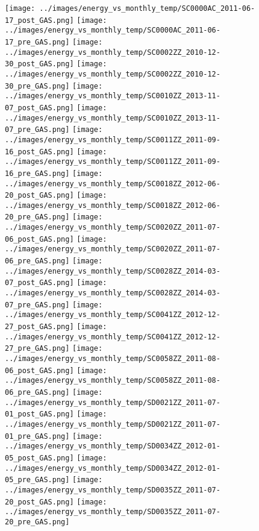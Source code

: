 \clearpage
\begin{figure}
\centering
\texttt{[image: ../images/energy\_vs\_monthly\_temp/SC0000AC\_2011-06-17\_post\_GAS.png]}
\texttt{[image: ../images/energy\_vs\_monthly\_temp/SC0000AC\_2011-06-17\_pre\_GAS.png]}
\texttt{[image: ../images/energy\_vs\_monthly\_temp/SC0002ZZ\_2010-12-30\_post\_GAS.png]}
\texttt{[image: ../images/energy\_vs\_monthly\_temp/SC0002ZZ\_2010-12-30\_pre\_GAS.png]}
\texttt{[image: ../images/energy\_vs\_monthly\_temp/SC0010ZZ\_2013-11-07\_post\_GAS.png]}
\texttt{[image: ../images/energy\_vs\_monthly\_temp/SC0010ZZ\_2013-11-07\_pre\_GAS.png]}
\texttt{[image: ../images/energy\_vs\_monthly\_temp/SC0011ZZ\_2011-09-16\_post\_GAS.png]}
\texttt{[image: ../images/energy\_vs\_monthly\_temp/SC0011ZZ\_2011-09-16\_pre\_GAS.png]}
\texttt{[image: ../images/energy\_vs\_monthly\_temp/SC0018ZZ\_2012-06-20\_post\_GAS.png]}
\texttt{[image: ../images/energy\_vs\_monthly\_temp/SC0018ZZ\_2012-06-20\_pre\_GAS.png]}
\texttt{[image: ../images/energy\_vs\_monthly\_temp/SC0020ZZ\_2011-07-06\_post\_GAS.png]}
\texttt{[image: ../images/energy\_vs\_monthly\_temp/SC0020ZZ\_2011-07-06\_pre\_GAS.png]}
\texttt{[image: ../images/energy\_vs\_monthly\_temp/SC0028ZZ\_2014-03-07\_post\_GAS.png]}
\texttt{[image: ../images/energy\_vs\_monthly\_temp/SC0028ZZ\_2014-03-07\_pre\_GAS.png]}
\texttt{[image: ../images/energy\_vs\_monthly\_temp/SC0041ZZ\_2012-12-27\_post\_GAS.png]}
\texttt{[image: ../images/energy\_vs\_monthly\_temp/SC0041ZZ\_2012-12-27\_pre\_GAS.png]}
\texttt{[image: ../images/energy\_vs\_monthly\_temp/SC0058ZZ\_2011-08-06\_post\_GAS.png]}
\texttt{[image: ../images/energy\_vs\_monthly\_temp/SC0058ZZ\_2011-08-06\_pre\_GAS.png]}
\texttt{[image: ../images/energy\_vs\_monthly\_temp/SD0021ZZ\_2011-07-01\_post\_GAS.png]}
\texttt{[image: ../images/energy\_vs\_monthly\_temp/SD0021ZZ\_2011-07-01\_pre\_GAS.png]}
\texttt{[image: ../images/energy\_vs\_monthly\_temp/SD0034ZZ\_2012-01-05\_post\_GAS.png]}
\texttt{[image: ../images/energy\_vs\_monthly\_temp/SD0034ZZ\_2012-01-05\_pre\_GAS.png]}
\texttt{[image: ../images/energy\_vs\_monthly\_temp/SD0035ZZ\_2011-07-20\_post\_GAS.png]}
\texttt{[image: ../images/energy\_vs\_monthly\_temp/SD0035ZZ\_2011-07-20\_pre\_GAS.png]}
\end{figure}
